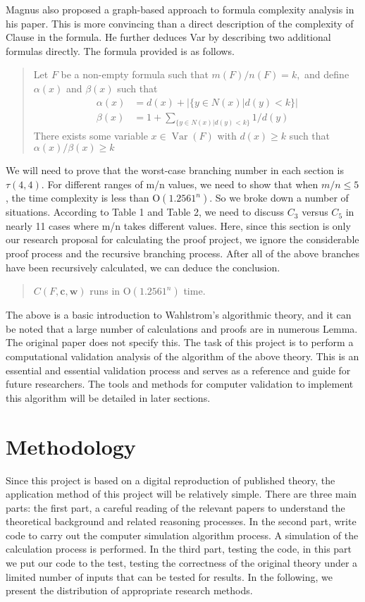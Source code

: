 \documentclass{sigchi}
\begin{document}
Magnus also proposed a graph-based approach to formula complexity analysis in his paper. This is more convincing than a direct description of the complexity of Clause in the formula. He further deduces Var by describing two additional formulas directly. The formula provided is as follows.
\begin{quote}
	Let $F$ be a non-empty formula such that $m(F) / n(F)=k,$ and define $\alpha(x)$ and
	$\beta(x)$ such that
	$$
	\begin{aligned}
	\alpha(x) &=d(x)+|\{y \in N(x) | d(y)<k\}| \\
	\beta(x) &=1+\sum_{\{y \in N(x) | d(y)<k\}} 1 / d(y)
	\end{aligned}
	$$
	There exists some variable $x \in \operatorname{Var}(F)$ with $d(x) \geqslant k$ such that $\alpha(x) / \beta(x) \geqslant k$
\end{quote}
We will need to prove that the worst-case branching number in each section is $\tau(4,4)$. For different ranges of m/n values, we need to show that when $m/n\leqslant5$, the time complexity is less than $\mathrm{O}\left(1.2561^{n}\right)$. So we broke down a number of situations. According to Table 1 and Table 2, we need to discuss $C_{3}$ versus $C_{5}$ in nearly 11 cases where m/n takes different values. Here, since this section is only our research proposal for calculating the proof project, we ignore the considerable proof process and the recursive branching process. After all of the above branches have been recursively calculated, we can deduce the conclusion.
\begin{quote}
	$C(F, \mathbf{c}, \mathbf{w})$ runs in $\mathrm{O}\left(1.2561^{n}\right)$ time.
\end{quote}
The above is a basic introduction to Wahlstrom's algorithmic theory, and it can be noted that a large number of calculations and proofs are in numerous Lemma. The original paper does not specify this. The task of this project is to perform a computational validation analysis of the algorithm of the above theory. This is an essential and essential validation process and serves as a reference and guide for future researchers. The tools and methods for computer validation to implement this algorithm will be detailed in later sections.

\section{Methodology}
Since this project is based on a digital reproduction of published theory, the application method of this project will be relatively simple. There are three main parts: the first part, a careful reading of the relevant papers to understand the theoretical background and related reasoning processes. In the second part, write code to carry out the computer simulation algorithm process. A simulation of the calculation process is performed. In the third part, testing the code, in this part we put our code to the test, testing the correctness of the original theory under a limited number of inputs that can be tested for results. In the following, we present the distribution of appropriate research methods.
\end{document}
